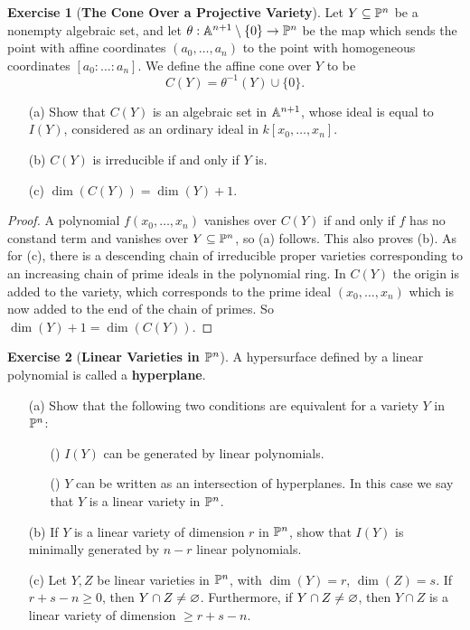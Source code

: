 \documentclass[11pt]{book}
\theoremstyle{definition}
\newtheorem{exercise}{Exercise}[section]
\begin{document}
\begin{exercise}[\textbf{The Cone Over a Projective Variety}]
Let $Y\sub\P^n$ be a nonempty algebraic set, and let $\theta:\A^{n+1}\setminus\{0\}\to\P^n$ be the map which sends the point with affine coordinates $(a_0,\dots,a_n)$ to the point with homogeneous coordinates $[a_0:\dots:a_n]$. We define the affine cone over $Y$ to be
\[C(Y)=\theta^{-1}(Y)\cup\{0\}.\]
\begin{itemize}
\item[(a)] Show that $C(Y)$ is an algebraic set in $\A^{n+1}$, whose ideal is equal to $I(Y)$, considered as an ordinary ideal in $k[x_0,\dots,x_n]$.
\item[(b)] $C(Y)$ is irreducible if and only if $Y$ is.
\item[(c)] $\dim(C(Y))=\dim(Y)+1$.
\end{itemize}
\end{exercise}
\begin{proof}
A polynomial $f(x_0,\dots,x_n)$ vanishes over $C(Y)$ if and only if $f$ has no constand term and vanishes over $Y\sub\P^n$, so (a) follows. This also proves (b). As for (c), there is a descending chain of irreducible proper varieties corresponding to an increasing chain of prime ideals in the polynomial ring. In $C(Y)$ the origin is added to the variety, which corresponds to the prime ideal $(x_0,\dots,x_n)$ which is now added to the end of the chain of primes. So $\dim(Y)+1=\dim(C(Y))$.
\end{proof}
\begin{exercise}[\textbf{Linear Varieties in $\P^n$}]
A hypersurface defined by a linear polynomial is called a \textbf{hyperplane}.
\begin{itemize}
\item[(a)] Show that the following two conditions are equivalent for a variety $Y$ in $\P^n$:
\begin{itemize}
\item[(\rmnum{1})] $I(Y)$ can be generated by linear polynomials.
\item[(\rmnum{2})] $Y$ can be written as an intersection of hyperplanes.
In this case we say that $Y$ is a linear variety in $\P^n$. 
\end{itemize} 
\item[(b)] If $Y$ is a linear variety of dimension $r$ in $\P^n$, show that $I(Y)$ is minimally generated by $n-r$ linear polynomials.
\item[(c)] Let $Y,Z$ be linear varieties in $\P^n$, with $\dim(Y)=r$, $\dim(Z)=s$. If $r+s-n\geq 0$, then $Y\cap Z\neq\emp$. Furthermore, if $Y\cap Z\neq\emp$, then $Y\cap Z$ is a linear variety of dimension $\geq r+s-n$.
\end{itemize}
\end{exercise}
\end{document}
